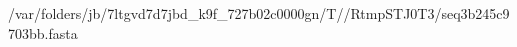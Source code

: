\documentclass[10pt]{article}
\begin{document}
\begin{texshade}{/var/folders/jb/7ltgvd7d7jbd_k9f_727b02c0000gn/T//RtmpSTJ0T3/seq3b245c9703bb.fasta}
\hidelogoscale
{}
\showlegend
\end{texshade}
\end{document}
